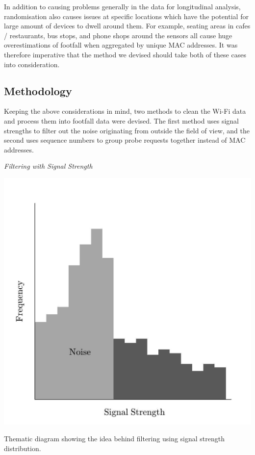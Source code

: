 In addition to causing problems generally in the data for longitudinal analysis, randomisation also causes issues at specific locations which have the potential for large amount of devices to dwell around them.
For example, seating areas in cafes / restaurants, bus stops, and phone shops around the sensors all cause huge overestimations of footfall when aggregated by unique MAC addresses.
It was therefore imperative that the method we devised should take both of these cases into consideration.


\subsection{Methodology}
Keeping the above considerations in mind, two methods to clean the Wi-Fi data and process them into footfall data were devised.
The first method uses signal strengths to filter out the noise originating from outside the field of view, and the second uses sequence numbers to group probe requests together instead of MAC addresses.

\vspace{1.5em}\noindent\textit{Filtering with Signal Strength}\vspace{0.5em}

\begin{marginfigure}
  \includegraphics[trim={5 5 5 5},clip]{images/processing-method-signal.jpg}
  \caption{Thematic diagram showing the idea behind filtering using signal strength distribution.}
  \label{figure:processing:method:signal}
\end{marginfigure}

